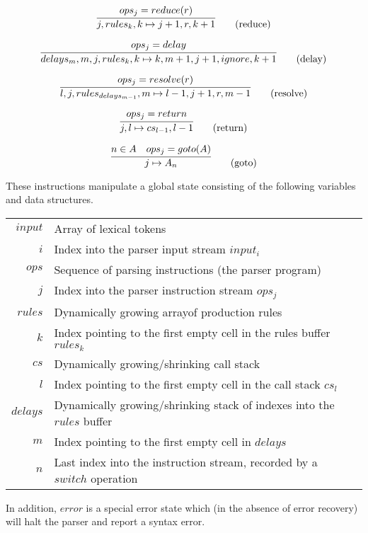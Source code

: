 \documentclass[A4]{sig-alternate}
\begin{document}
\begin{equation}
\infer{j, rules_k, k \mapsto j+1, r, k+1}{ops_j = reduce(r)} \tag{reduce}
\end{equation}

\begin{equation}
\infer{delays_m, m, j, rules_k, k \mapsto k, m+1, j+1, ignore, k+1}{ops_j = delay} \tag{delay}
\end{equation}

\begin{equation}
\infer{l, j, rules_{delays_{m-1}}, m \mapsto l-1, j+1, r, m-1}{ops_j = resolve(r)} \tag{resolve}
\end{equation}

\begin{equation}
\infer{j, l \mapsto cs_{l-1}, l-1}{ops_j = return} \tag{return}
\end{equation}

\begin{equation}
\infer{j \mapsto A_{n}}{n \in A & ops_j = goto(A)} \tag{goto}
\end{equation}

These instructions manipulate a global state consisting of the following variables and data structures.
\begin{center}
{\small
\renewcommand{\tabcolsep}{5pt}
\renewcommand{\arraystretch}{1.3}
\begin{tabular}{r p{6cm} l}
$input$  & Array of lexical tokens\\
$i$      & Index into the parser input stream $input_i$\\
$ops$    & Sequence of parsing instructions (the parser program)\\
$j$      & Index into the parser instruction stream $ops_j$\\
$rules$  & Dynamically growing array\footnotemark\;of production rules\\
$k$      & Index pointing to the first empty cell in the rules buffer $rules_k$\\
$cs$     & Dynamically growing/shrinking call stack\\
$l$      & Index pointing to the first empty cell in the call stack $cs_l$\\
$delays$ & Dynamically growing/shrinking stack of indexes into the $rules$ buffer\\
$m$      & Index pointing to the first empty cell in $delays$\\
$n$      & Last index into the instruction stream, recorded by a $switch$ operation
\end{tabular}}
\end{center}
In addition, $error$ is a special error state which (in the absence of error recovery) will halt the parser and report a syntax error.
\end{document}
